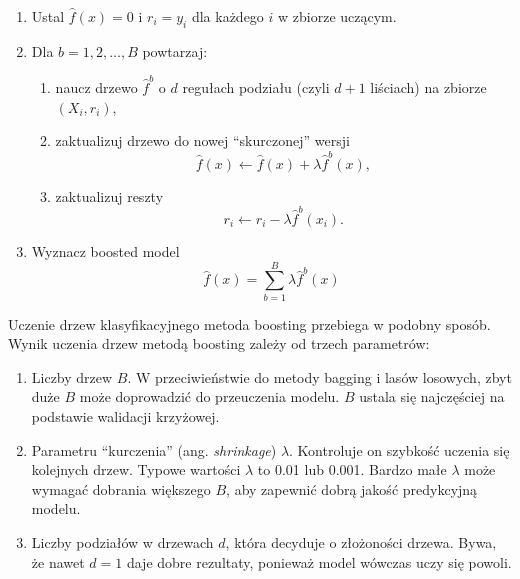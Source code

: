 \documentclass[]{book}
\providecommand{\tightlist}{%
  \setlength{\itemsep}{0pt}\setlength{\parskip}{0pt}}
\theoremstyle{plain}
\theoremstyle{definition}
\theoremstyle{definition}
\theoremstyle{definition}
\theoremstyle{definition}
\theoremstyle{remark}
\begin{document}
\begin{enumerate}
\def\labelenumi{\arabic{enumi}.}
\tightlist
\item
  Ustal \(\hat{f}(x)=0\) i \(r_i=y_i\) dla każdego \(i\) w zbiorze uczącym.
\item
  Dla \(b=1,2,\ldots, B\) powtarzaj:

  \begin{enumerate}
  \def\labelenumii{\alph{enumii})}
  \tightlist
  \item
    naucz drzewo \(\hat{f}^b\) o \(d\) regułach podziału (czyli \(d+1\) liściach) na zbiorze \((X_i, r_i)\),
  \item
    zaktualizuj drzewo do nowej ``skurczonej'' wersji
    \begin{equation}
     \hat{f}(x)\leftarrow \hat{f}(x)+\lambda\hat{f}^b(x),
    \end{equation}
  \item
    zaktualizuj reszty
    \begin{equation}
     r_i\leftarrow r_i-\lambda\hat{f}^b(x_i).
    \end{equation}
  \end{enumerate}
\item
  Wyznacz boosted model
  \begin{equation}
    \hat{f}(x) = \sum_{b=1}^B\lambda\hat{f}^b(x)
  \end{equation}
\end{enumerate}

Uczenie drzew klasyfikacyjnego metoda boosting przebiega w podobny sposób. Wynik uczenia drzew metodą boosting zależy od trzech parametrów:

\begin{enumerate}
\def\labelenumi{\arabic{enumi}.}
\tightlist
\item
  Liczby drzew \(B\). W przeciwieństwie do metody bagging i lasów losowych, zbyt duże \(B\) może doprowadzić do przeuczenia modelu. \(B\) ustala się najczęściej na podstawie walidacji krzyżowej.
\item
  Parametru ``kurczenia'' (ang. \emph{shrinkage}) \(\lambda\). Kontroluje on szybkość uczenia się kolejnych drzew. Typowe wartości \(\lambda\) to 0.01 lub 0.001. Bardzo małe \(\lambda\) może wymagać dobrania większego \(B\), aby zapewnić dobrą jakość predykcyjną modelu.
\item
  Liczby podziałów w drzewach \(d\), która decyduje o złożoności drzewa. Bywa, że nawet \(d=1\) daje dobre rezultaty, ponieważ model wówczas uczy się powoli.
\end{enumerate}
\end{document}
